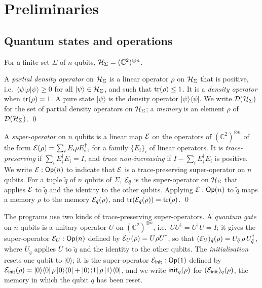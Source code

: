 \section{Preliminaries}\label{sec:prelim}

\subsection{Quantum states and operations}

For a finite set $\Sigma$ of $n$ qubits, $\mathcal{H}_\Sigma = (\mathbb{C}^2)^{\otimes n}$.

\begin{definition}\label{def:density}
A \emph{partial density operator} on $\mathcal{H}_\Sigma$ is a linear operator $\rho$
on $\mathcal{H}_\Sigma$ that is positive, i.e.\ $\langle\psi|\rho|\psi\rangle \ge 0$
for all $|\psi\rangle \in \mathcal{H}_\Sigma$, and such that $\mathrm{tr}(\rho) \le 1$. It is a
\emph{density operator} when $\mathrm{tr}(\rho) = 1$. A pure state $|\psi\rangle$ is the
density operator $|\psi\rangle\langle\psi|$. We write $\mathcal{D}(\mathcal{H}_\Sigma)$ for
the set of partial density operators on $\mathcal{H}_\Sigma$; a \emph{memory} is an
element $\rho$ of $\mathcal{D}(\mathcal{H}_\Sigma)$.
\qed
\end{definition}

\begin{definition}\label{def:sop}
A \emph{super-operator} on $n$ qubits is a linear map $\mathcal{E}$ on the
operators of $(\mathbb{C}^2)^{\otimes n}$ of the form
$\mathcal{E}(\rho) = \sum_i E_i \rho E_i^\dagger$, for a family $\{E_i\}_i$ of
linear operators. It is \emph{trace-preserving} if
$\sum_i E_i^\dagger E_i = I$, and \emph{trace non-increasing} if
$I - \sum_i E_i^\dagger E_i$ is positive. We write
$\mathcal{E} : \mathsf{Op}(n)$ to indicate that $\mathcal{E}$ is a trace-preserving
super-operator on $n$ qubits. For a tuple $\tilde q$ of $n$ qubits of
$\Sigma$, $\mathcal{E}_{\tilde q}$ is the super-operator on $\mathcal{H}_\Sigma$ that
applies $\mathcal{E}$ to $\tilde q$ and the identity to the other qubits.
Applying $\mathcal{E} : \mathsf{Op}(n)$ to $\tilde q$ maps a memory $\rho$ to
the memory ${\mathcal{E}}_{\tilde q}(\rho)$, and $\mathrm{tr}({\mathcal{E}}_{\tilde q}(\rho)) = \mathrm{tr}(\rho)$.
\qed
\end{definition}

The programs use two kinds of trace-preserving super-operators. A
\emph{quantum gate} on $n$ qubits is a unitary operator $U$ on
$(\mathbb{C}^2)^{\otimes n}$, i.e.\ $UU^\dagger = U^\dagger U = I$; it gives
the super-operator $\mathcal{E}_U : \mathsf{Op}(n)$ defined by
$\mathcal{E}_U(\rho) = U \rho U^\dagger$, so that
$(\mathcal{E}_U)_{\tilde q}(\rho) = U_{\tilde q}\,\rho\,U_{\tilde q}^{\dagger}$, where $U_{\tilde q}$ applies $U$ to $\tilde q$
and the identity to the other qubits. The \emph{initialisation} resets one
qubit to $|0\rangle$; it is the super-operator
$\mathcal{E}_{\mathsf{init}} : \mathsf{Op}(1)$ defined by
$\mathcal{E}_{\mathsf{init}}(\rho) = |0\rangle\langle 0| \,\rho\, |0\rangle\langle 0|
+ |0\rangle\langle 1| \,\rho\, |1\rangle\langle 0|$, and we
write $\mathsf{init}_{q}(\rho)$ for $(\mathcal{E}_{\mathsf{init}})_{q}(\rho)$, the memory in which
the qubit $q$ has been reset.

